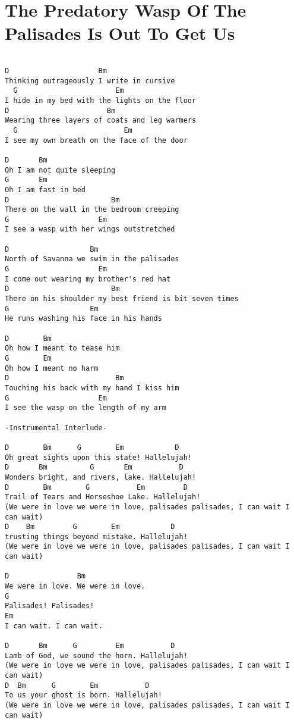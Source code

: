 \documentclass[leqno]{memoir}
\begin{document}
\chapter{The Predatory Wasp Of The Palisades Is Out To Get Us}
\begin{verbatim}

D                     Bm
Thinking outrageously I write in cursive
  G                       Em                     
I hide in my bed with the lights on the floor
D                       Bm
Wearing three layers of coats and leg warmers
  G                         Em
I see my own breath on the face of the door

D       Bm
Oh I am not quite sleeping
G       Em
Oh I am fast in bed
D                        Bm
There on the wall in the bedroom creeping
G                     Em
I see a wasp with her wings outstretched

D                   Bm
North of Savanna we swim in the palisades
G                     Em
I come out wearing my brother's red hat
D                        Bm
There on his shoulder my best friend is bit seven times
G                   Em
He runs washing his face in his hands

D        Bm
Oh how I meant to tease him
G        Em
Oh how I meant no harm
D                         Bm
Touching his back with my hand I kiss him
G                     Em
I see the wasp on the length of my arm

-Instrumental Interlude-

D        Bm      G        Em            D
Oh great sights upon this state! Hallelujah!
D       Bm          G       Em           D 
Wonders bright, and rivers, lake. Hallelujah!
D        Bm        G           Em         D
Trail of Tears and Horseshoe Lake. Hallelujah!
(We were in love we were in love, palisades palisades, I can wait I can wait)
D    Bm         G        Em            D
trusting things beyond mistake. Hallelujah!
(We were in love we were in love, palisades palisades, I can wait I can wait)

D                Bm
We were in love. We were in love.
G
Palisades! Palisades!
Em
I can wait. I can wait.

D       Bm      G         Em           D
Lamb of God, we sound the horn. Hallelujah!
(We were in love we were in love, palisades palisades, I can wait I can wait)
D  Bm      G        Em           D
To us your ghost is born. Hallelujah!
(We were in love we were in love, palisades palisades, I can wait I can wait)


\end{verbatim}
\end{document}
